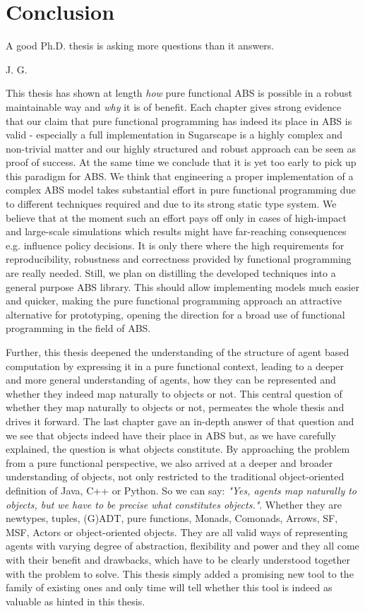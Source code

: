 \chapter{Conclusion}
\epigraph{A good Ph.D. thesis is asking more questions than it answers.}{J. G.}
\label{ch:conclusion}

This thesis has shown at length \textit{how} pure functional ABS is possible in a robust maintainable way and \textit{why} it is of benefit. Each chapter gives strong evidence that our claim that pure functional programming has indeed its place in ABS is valid - especially a full implementation in Sugarscape is a highly complex and non-trivial matter and our highly structured and robust approach can be seen as proof of success. At the same time we conclude that it is yet too early to pick up this paradigm for ABS. We think that engineering a proper implementation of a complex ABS model takes substantial effort in pure functional programming due to different techniques required and due to its strong static type system. We believe that at the moment such an effort pays off only in cases of high-impact and large-scale simulations which results might have far-reaching consequences e.g. influence policy decisions. It is only there where the high requirements for reproducibility, robustness and correctness provided by functional programming are really needed. Still, we plan on distilling the developed techniques into a general purpose ABS library. This should allow implementing models much easier and quicker, making the pure functional programming approach an attractive alternative for prototyping, opening the direction for a broad use of functional programming in the field of ABS.

Further, this thesis deepened the understanding of the structure of agent based computation by expressing it in a pure functional context, leading to a deeper and more general understanding of agents, how they can be represented and whether they indeed map naturally to objects or not. This central question of whether they map naturally to objects or not, permeates the whole thesis and drives it forward. The last chapter gave an in-depth answer of that question and we see that objects indeed have their place in ABS but, as we have carefully explained, the question is what objects constitute. By approaching the problem from a pure functional perspective, we also arrived at a deeper and broader understanding of objects, not only restricted to the traditional object-oriented definition of Java, C++ or Python. So we can say: \textit{"Yes, agents map naturally to objects, but we have to be precise what constitutes objects."}. Whether they are newtypes, tuples, (G)ADT, pure functions, Monads, Comonads, Arrows, SF, MSF, Actors or object-oriented objects. They are all valid ways of representing agents with varying degree of abstraction, flexibility and power and they all come with their benefit and drawbacks, which have to be clearly understood together with the problem to solve. This thesis simply added a promising new tool to the family of existing ones and only time will tell whether this tool is indeed as valuable as hinted in this thesis.


